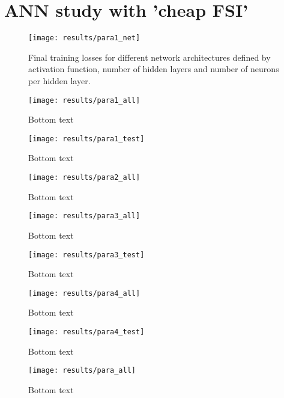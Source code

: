 \section{ANN study with 'cheap FSI'}

\begin{figure}
    \centering
    \texttt{[image: results/para1\_net]}
    \caption{Final training losses for different network architectures defined by activation function, number of hidden layers and number of neurons per hidden layer.}
    \label{fig:para1_net}
\end{figure}

\begin{figure}
    \centering
    \texttt{[image: results/para1\_all]}
    \caption{Bottom text}
    \label{fig:para1_all}
\end{figure}

\begin{figure}
    \centering
    \texttt{[image: results/para1\_test]}
    \caption{Bottom text}
    \label{fig:para1_test}
\end{figure}

\begin{figure}
    \centering
    \texttt{[image: results/para2\_all]}
    \caption{Bottom text}
    \label{fig:para2_all}
\end{figure}

\begin{figure}
    \centering
    \texttt{[image: results/para3\_all]}
    \caption{Bottom text}
    \label{fig:para3_all}
\end{figure}

\begin{figure}
    \centering
    \texttt{[image: results/para3\_test]}
    \caption{Bottom text}
    \label{fig:para3_test}
\end{figure}

\begin{figure}
    \centering
    \texttt{[image: results/para4\_all]}
    \caption{Bottom text}
    \label{fig:para4_all}
\end{figure}

\begin{figure}
    \centering
    \texttt{[image: results/para4\_test]}
    \caption{Bottom text}
    \label{fig:para4_test}
\end{figure}

\begin{figure}
    \centering
    \texttt{[image: results/para\_all]}
    \caption{Bottom text}
    \label{fig:para_all}
\end{figure}

